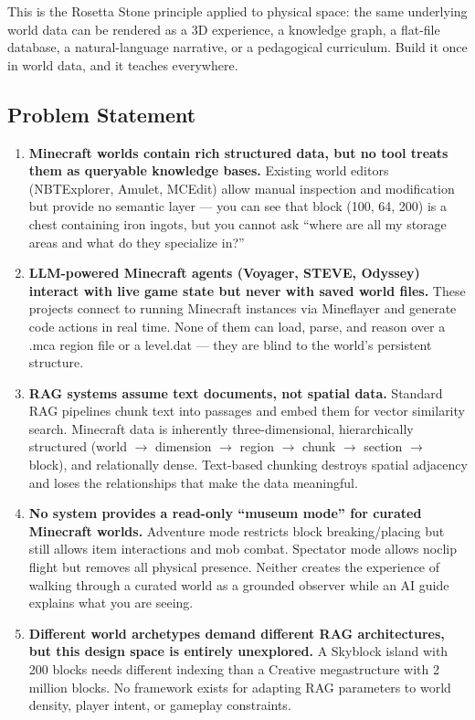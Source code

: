 \documentclass[11pt,letterpaper]{article}
\begin{document}
This is the Rosetta Stone principle applied to physical space: the same underlying world data can be rendered as a 3D experience, a knowledge graph, a flat-file database, a natural-language narrative, or a pedagogical curriculum. Build it once in world data, and it teaches everywhere.

\subsection{Problem Statement}

\begin{enumerate}[leftmargin=2em]
\item \textbf{Minecraft worlds contain rich structured data, but no tool treats them as queryable knowledge bases.} Existing world editors (NBTExplorer, Amulet, MCEdit) allow manual inspection and modification but provide no semantic layer --- you can see that block (100, 64, 200) is a chest containing iron ingots, but you cannot ask ``where are all my storage areas and what do they specialize in?''

\item \textbf{LLM-powered Minecraft agents (Voyager, STEVE, Odyssey) interact with live game state but never with saved world files.} These projects connect to running Minecraft instances via Mineflayer and generate code actions in real time. None of them can load, parse, and reason over a .mca region file or a level.dat --- they are blind to the world's persistent structure.

\item \textbf{RAG systems assume text documents, not spatial data.} Standard RAG pipelines chunk text into passages and embed them for vector similarity search. Minecraft data is inherently three-dimensional, hierarchically structured (world $\rightarrow$ dimension $\rightarrow$ region $\rightarrow$ chunk $\rightarrow$ section $\rightarrow$ block), and relationally dense. Text-based chunking destroys spatial adjacency and loses the relationships that make the data meaningful.

\item \textbf{No system provides a read-only ``museum mode'' for curated Minecraft worlds.} Adventure mode restricts block breaking/placing but still allows item interactions and mob combat. Spectator mode allows noclip flight but removes all physical presence. Neither creates the experience of walking through a curated world as a grounded observer while an AI guide explains what you are seeing.

\item \textbf{Different world archetypes demand different RAG architectures, but this design space is entirely unexplored.} A Skyblock island with 200 blocks needs different indexing than a Creative megastructure with 2 million blocks. No framework exists for adapting RAG parameters to world density, player intent, or gameplay constraints.
\end{enumerate}
\end{document}

